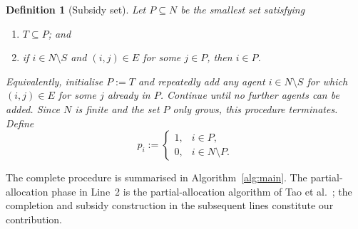 \documentclass[11pt]{article}
\theoremstyle{plain}
\newtheorem{definition}{Definition}
\theoremstyle{plain}
\newcommand{\agents}{N}                       %
\newcommand{\subsidy}{p}                      %
\begin{document}
\begin{definition}[Subsidy set]
\label{def:m-P}
Let $P\subseteq\agents$ be the smallest set satisfying
\begin{enumerate}
  \item[(P1)] $T\subseteq P$; and
  \item[(P2)] if $i\in\agents\setminus S$ and $(i,j)\in E$ for some
        $j\in P$, then $i\in P$.
\end{enumerate}
Equivalently, initialise $P:=T$ and repeatedly add any agent $i\in\agents\setminus S$ for which $(i,j)\in E$ for some $j$ already in $P$. Continue until no further agents can be added. Since $\agents$ is finite and the set $P$ only grows, this procedure terminates.
Define
\begin{equation}
\label{eq:m-subsidy}
  \subsidy_i :=
  \begin{cases}
    1, & i\in P,\\
    0, & i\in\agents\setminus P.
  \end{cases}
\end{equation}
\end{definition}

The complete procedure is summarised in Algorithm~\ref{alg:main}. The partial-allocation phase in Line~2 is the partial-allocation algorithm of Tao et al.~\cite{tao2025existence}; the completion and subsidy construction in the subsequent lines constitute our contribution.
\end{document}
